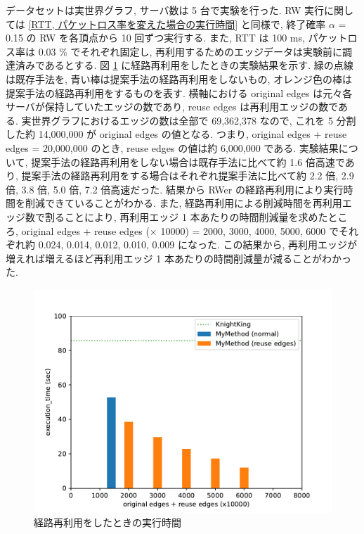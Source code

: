 データセットは実世界グラフ, サーバ数は 5 台で実験を行った. RW 実行に関しては \ref{RTT, パケットロス率を変えた場合の実行時間} と同様で, 終了確率 $\alpha$ = 0.15 の RW を各頂点から 10 回ずつ実行する. また, RTT は 100 ms, パケットロス率は 0.03 \% でそれぞれ固定し, 再利用するためのエッジデータは実験前に調達済みであるとする. 図 \ref{経路再利用をしたときの実行時間} に経路再利用をしたときの実験結果を示す. 緑の点線は既存手法を, 青い棒は提案手法の経路再利用をしないもの, オレンジ色の棒は提案手法の経路再利用をするものを表す. 横軸における original edges は元々各サーバが保持していたエッジの数であり, reuse edges は再利用エッジの数である. 実世界グラフにおけるエッジの数は全部で 69,362,378 なので, これを 5 分割した約 14,000,000 が original edges の値となる. つまり, original edges + reuse edges = 20,000,000 のとき, reuse edges の値は約 6,000,000 である. 実験結果について, 提案手法の経路再利用をしない場合は既存手法に比べて約 1.6 倍高速であり, 提案手法の経路再利用をする場合はそれぞれ提案手法に比べて約 2.2 倍, 2.9 倍, 3.8 倍, 5.0 倍, 7.2 倍高速だった. 結果から RWer の経路再利用により実行時間を削減できていることがわかる. また, 経路再利用による削減時間を再利用エッジ数で割ることにより, 再利用エッジ 1 本あたりの時間削減量を求めたところ, original edges + reuse edges ($\times$ 10000) = 2000, 3000, 4000, 5000, 6000 でそれぞれ約 0.024, 0.014, 0.012, 0.010, 0.009 になった. この結果から, 再利用エッジが増えれば増えるほど再利用エッジ 1 本あたりの時間削減量が減ることがわかった. 

\begin{figure}[t]
    \centering
    \includegraphics[scale=0.8]{figure/AR_cache.pdf}
    \caption{経路再利用をしたときの実行時間}
    \label{経路再利用をしたときの実行時間}
\end{figure}

